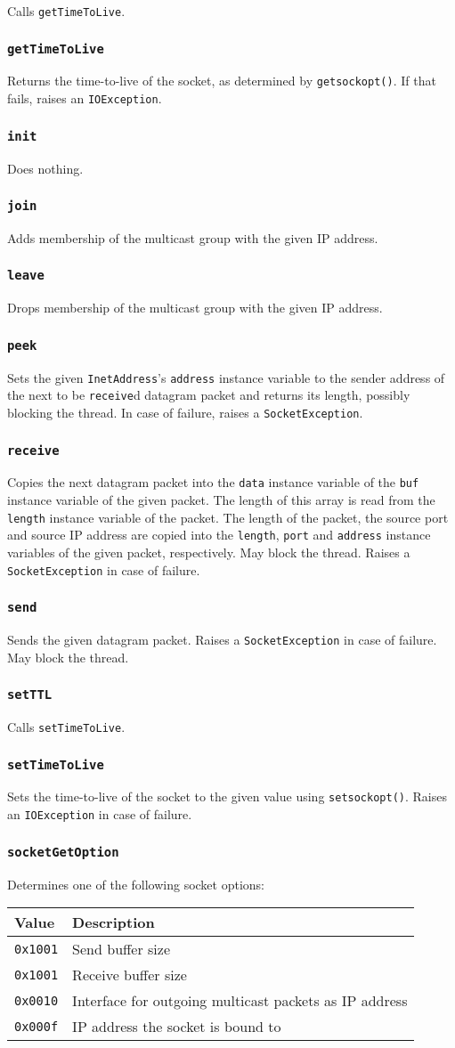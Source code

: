 \documentclass[twocolumn,a4paper]{article}      %
\newcommand{\method}[1]{\subsubsection*{\texttt{#1}}}
\begin{document}
Calls \texttt{getTimeToLive}.

\method{getTimeToLive}

Returns the time-to-live of the socket, as determined by
\texttt{getsockopt()}. If that fails, raises an \texttt{IOException}.

\method{init}

Does nothing.

\method{join}

Adds membership of the multicast group with the given IP address.

\method{leave}

Drops membership of the multicast group with the given IP address.

\method{peek}

Sets the given \texttt{InetAddress}'s \texttt{address} instance
variable to the sender address of the next to be \texttt{receive}d
datagram packet and returns its length, possibly blocking the thread.
In case of failure, raises a \texttt{SocketException}.

\method{receive}

Copies the next datagram packet into the \texttt{data} instance
variable of the \texttt{buf} instance variable of the given
packet. The length of this array is read from the \texttt{length}
instance variable of the packet. The length of the packet, the source
port and source IP address are copied into the \texttt{length},
\texttt{port} and \texttt{address} instance variables of the given
packet, respectively. May block the thread. Raises a
\texttt{SocketException} in case of failure.

\method{send}

Sends the given datagram packet. Raises a \texttt{SocketException} in
case of failure. May block the thread.

\method{setTTL}

Calls \texttt{setTimeToLive}.

\method{setTimeToLive}

Sets the time-to-live of the socket to the given value using
\texttt{setsockopt()}. Raises an \texttt{IOException} in case of
failure.

\method{socketGetOption}

Determines one of the following socket options:

\medskip
\begin{tabular}{|l|p{5cm}|} \hline
Value           & Description \\ \hline
\texttt{0x1001} & Send buffer size \\
\texttt{0x1001} & Receive buffer size \\
\texttt{0x0010} & Interface for outgoing multicast packets as IP address \\
\texttt{0x000f} & IP address the socket is bound to \\ \hline
\end{tabular}
\medskip
\end{document}
